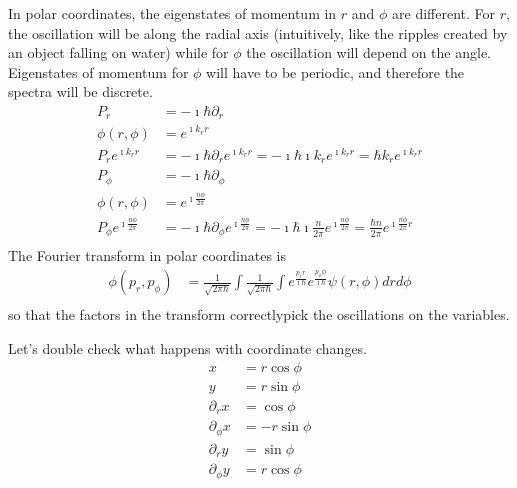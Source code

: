 \documentclass[11pt]{article}
\begin{document}
In polar coordinates, the eigenstates of momentum in $r$ and $\phi$ are different. For $r$, the oscillation will be along the radial axis (intuitively, like the ripples created by an object falling on water) while for $\phi$ the oscillation will depend on the angle. Eigenstates of momentum for $\phi$ will have to be periodic, and therefore the spectra will be discrete.
\begin{equation}
	\begin{aligned}
		P_r &= - \imath \hbar \partial_r \\
		\phi(r,\phi) &= e^{\imath k_r r} \\
		P_r e^{\imath k_r r} &= - \imath \hbar \partial_r e^{\imath k_r r} = - \imath \hbar \imath k_r e^{\imath k_r r} = \hbar k_r e^{\imath k_r r} \\ 
		P_\phi &= - \imath \hbar \partial_\phi \\
		\phi(r,\phi) &= e^{\imath \frac{ n \phi}{2 \pi}} \\
		P_\phi e^{\imath \frac{ n \phi}{2 \pi}} &= - \imath \hbar \partial_\phi e^{\imath \frac{ n \phi}{2 \pi}} = - \imath \hbar \imath \frac{ n }{2 \pi} e^{\imath \frac{ n \phi}{2 \pi}} = \frac{ \hbar n }{2 \pi} e^{\imath \frac{ n \phi}{2 \pi}r} \\ 
	\end{aligned}
\end{equation}
The Fourier transform in polar coordinates is
\begin{equation}
	\begin{aligned}
		\phi(p_r, p_\phi) &= \frac{1}{\sqrt{2 \pi \hbar}} \int \frac{1}{\sqrt{2 \pi \hbar}} \int e^{\frac{p_r r}{\imath \hbar}} e^{\frac{p_\phi \phi}{\imath \hbar}} \psi(r, \phi) dr d\phi \\
	\end{aligned}
\end{equation}
so that the factors in the transform correctlypick the oscillations on the variables.

Let's double check what happens with coordinate changes.
\begin{equation}
	\begin{aligned}
		x &= r \cos \phi \\
		y &= r \sin \phi \\
		\partial_r x &= \cos \phi \\
		\partial_\phi x &= - r \sin \phi \\
		\partial_r y &= \sin \phi \\
		\partial_\phi y &= r \cos \phi \\
	\end{aligned}
\end{equation}
\end{document}
